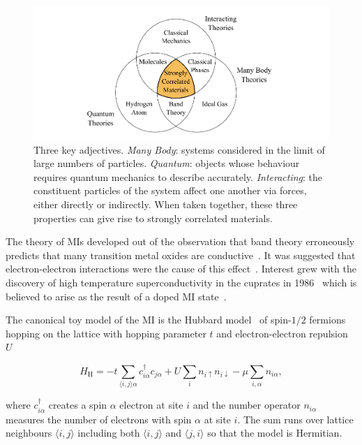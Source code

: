 \hypertarget{fig:venn_diagram}{%
\begin{figure}
\centering
\includegraphics[width=1\textwidth,height=\textheight]{figure_code/intro_chapter/venn_diagram}
\caption[{Interacting Quantum Many Body Systems Venn Diagram}]{Three key adjectives. \emph{Many Body}: systems considered in the limit of large numbers of particles. \emph{Quantum}: objects whose behaviour requires quantum mechanics to describe accurately. \emph{Interacting}: the constituent particles of the system affect one another via forces, either directly or indirectly. When taken together, these three properties can give rise to strongly correlated materials.}
\label{fig:venn_diagram}
\end{figure}
}

The theory of MIs developed out of the observation that band theory erroneously predicts that many transition metal oxides are conductive~\autocite{boerSemiconductorsPartiallyCompletely1937}. It was suggested that electron-electron interactions were the cause of this effect~\autocite{mottDiscussionPaperBoer1937}. Interest grew with the discovery of high temperature superconductivity in the cuprates in 1986~\autocite{bednorzPossibleHighTcSuperconductivity1986} which is believed to arise as the result of a doped MI state~\autocite{leeDopingMottInsulator2006}.

The canonical toy model of the MI is the Hubbard model~\autocite{gutzwillerEffectCorrelationFerromagnetism1963,kanamoriElectronCorrelationFerromagnetism1963,hubbardj.ElectronCorrelationsNarrow1963} of spin-\(1/2\) fermions hopping on the lattice with hopping parameter \(t\) and electron-electron repulsion \(U\)

\[ H_{\mathrm{H}} = -t \sum_{\langle i,j \rangle \alpha} c^\dagger_{i\alpha} c_{j\alpha} + U \sum_i n_{i\uparrow} n_{i\downarrow} - \mu \sum_{i,\alpha} n_{i\alpha},\]

where \(c^\dagger_{i\alpha}\) creates a spin \(\alpha\) electron at site \(i\) and the number operator \(n_{i\alpha}\) measures the number of electrons with spin \(\alpha\) at site \(i\). The sum runs over lattice neighbours \(\langle i,j \rangle\) including both \(\langle i,j \rangle\) and \(\langle j,i \rangle\) so that the model is Hermitian.

